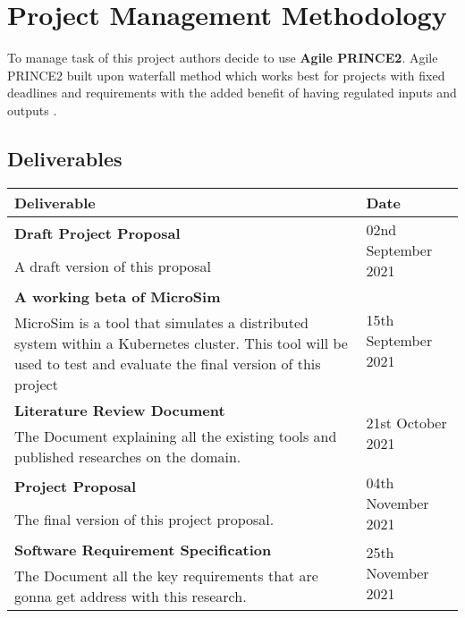 \section{Project Management Methodology}

To manage task of this project authors decide to use \textbf{Agile PRINCE2}. Agile PRINCE2 built upon waterfall method which works best for projects with fixed deadlines and requirements with the added benefit of having regulated inputs and outputs \citep{WhatAreT79:online}.

\subsection{Deliverables}
\setlength\LTleft{0mm}
\begin{longtable}{|p{115mm}|p{35mm}|}
\hline
\textbf{Deliverable} & \textbf{Date} \\ \hline
\textbf{Draft Project Proposal} & \multirow{2}{*}{02nd September 2021} \\
A draft version of this proposal &  \\ \hline
\textbf{A working beta of MicroSim}\label{microsim} & \multirow{2}{*}{15th September 2021} \\
MicroSim is a tool that simulates a distributed system within a Kubernetes cluster. This tool will be used to test and evaluate the final version of this project &  \\ \hline
\textbf{Literature Review Document} & \multirow{2}{*}{21st October 2021} \\
The Document explaining all the existing tools and published researches on the domain. &  \\ \hline
\textbf{Project Proposal} & \multirow{2}{*}{04th November 2021} \\
The final version of this project proposal. &  \\ \hline
\textbf{Software Requirement Specification} & \multirow{2}{*}{25th November 2021} \\
The Document all the key requirements that are gonna get address with this research. &  \\ \hline

\end{longtable}
